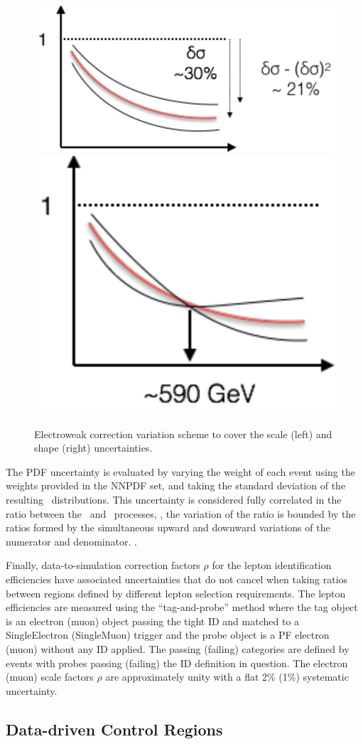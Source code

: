 \begin{figure}[htbp]
  \centering
  \includegraphics[height=0.3\textwidth]{Analysis/Figures/ewkcorr/scale.pdf}
  \includegraphics[height=0.3\textwidth]{Analysis/Figures/ewkcorr/shape.pdf}
  \caption{
    Electroweak correction variation scheme to cover the scale (left) and shape (right) uncertainties.
  }
  \label{fig:ewk_correction_cartoon}
\end{figure}

The PDF uncertainty is evaluated by varying the weight of each event using the weights provided in the NNPDF set, and taking the standard deviation of the resulting \ETg\ distributions. 
This uncertainty is considered fully correlated in the ratio between the \zinvg\ and \wlng\ processes, \ie, the variation of the ratio is bounded by the ratios formed by the simultaneous upward and downward variations of the numerator and denominator. .

Finally, data-to-simulation correction factors $\rho$ for the lepton identification efficiencies have associated uncertainties that do not cancel when taking ratios between regions defined by different lepton selection requirements.
The lepton efficiencies are measured using the ``tag-and-probe'' method where the tag object is an electron (muon) object passing the tight ID  and matched to a SingleElectron (SingleMuon) trigger and the probe object is a PF electron (muon) without any ID applied.
The passing (failing) categories are defined by events with probes passing (failing) the ID definition in question.
The electron (muon) scale factors $\rho$ are approximately unity with a flat 2\% (1\%) systematic uncertainty.

\subsection{Data-driven Control Regions}
\label{sec:control_regions}

